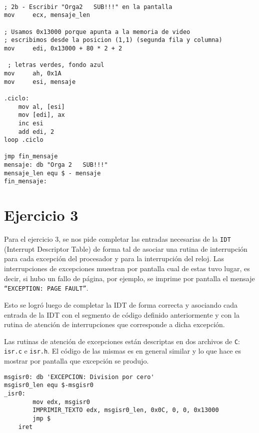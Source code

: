 \begin{verbatim}

; 2b - Escribir "Orga2   SUB!!!" en la pantalla
mov     ecx, mensaje_len

; Usamos 0x13000 porque apunta a la memoria de video
; escribimos desde la posicion (1,1) (segunda fila y columna)
mov     edi, 0x13000 + 80 * 2 + 2   

 ; letras verdes, fondo azul
mov     ah, 0x1A
mov     esi, mensaje

.ciclo:
	mov al, [esi]
	mov [edi], ax
	inc esi
	add edi, 2
loop .ciclo

jmp fin_mensaje
mensaje: db "Orga 2   SUB!!!"
mensaje_len equ $ - mensaje
fin_mensaje:

\end{verbatim}


\section{Ejercicio 3}

Para el ejercicio 3, se nos pide completar las entradas necesarias de la \texttt{IDT} (Interrupt Descriptor Table) de forma tal de asociar una rutina de interrupción para cada excepción del procesador y para la interrupción del reloj. Las interrupciones de excepciones muestran por pantalla cual de estas tuvo lugar, es decir, si hubo un fallo de página, por ejemplo, se imprime por pantalla el mensaje \texttt{``EXCEPTION: PAGE FAULT''}.

Esto se logró luego de completar la IDT de forma correcta y asociando cada entrada de la IDT con el segmento de código definido anteriormente y con la rutina de atención de interrupciones que corresponde a dicha excepción. %

Las rutinas de atención de excepciones están descriptas en dos archivos de \texttt{C}: \texttt{isr.c} e \texttt{isr.h}. El código de las mismas es en general similar y lo que hace es mostrar por pantalla que excepción se produjo. 

\begin{verbatim}
msgisr0: db 'EXCEPCION: Division por cero'
msgisr0_len equ $-msgisr0
_isr0:
        mov edx, msgisr0
        IMPRIMIR_TEXTO edx, msgisr0_len, 0x0C, 0, 0, 0x13000
        jmp $
    iret

\end{verbatim}

